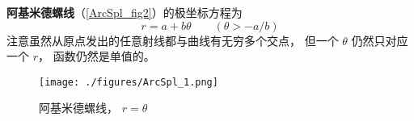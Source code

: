 
\begin{issues}
\issueNeedCite
\issueDraft
\end{issues}


\textbf{阿基米德螺线}（\autoref{ArcSpl_fig2}）的极坐标方程为
\begin{equation}
r = a + b\theta \qquad (\theta > -a/b)
\end{equation}
注意虽然从原点发出的任意射线都与曲线有无穷多个交点， 但一个 $\theta$ 仍然只对应一个 $r$， 函数仍然是单值的。

\begin{figure}[ht]
\centering
\texttt{[image: ./figures/ArcSpl\_1.png]}
\caption{阿基米德螺线， $r = \theta$} \label{ArcSpl_fig2}
\end{figure}
